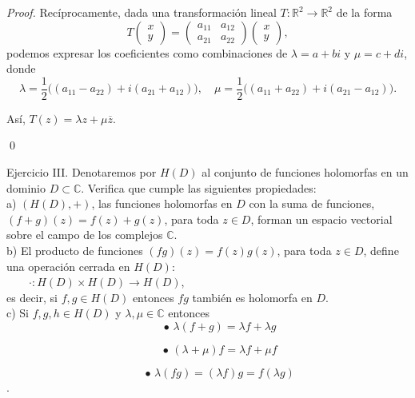 \documentclass{article}
\theoremstyle{nonumberplain}
\begin{document}
\begin{proof}
Recíprocamente, dada una transformación lineal \(T : \mathbb{R}^2 \to \mathbb{R}^2\) de la forma  
\[
T\begin{pmatrix} x \\ y \end{pmatrix} = 
\begin{pmatrix} a_{11} & a_{12} \\ a_{21} & a_{22} \end{pmatrix}
\begin{pmatrix} x \\ y \end{pmatrix},
\]  
podemos expresar los coeficientes como combinaciones de \(\lambda = a + bi\) y \(\mu = c + di\), donde  
\[
\lambda = \frac{1}{2}\big((a_{11} - a_{22}) + i(a_{21} + a_{12})\big), \quad 
\mu = \frac{1}{2}\big((a_{11} + a_{22}) + i(a_{21} - a_{12})\big).
\]

Así, \(T(z) = \lambda z + \mu \overline{z}\).  

\qed\end{proof}

Ejercicio III. Denotaremos por $H(D)$ al conjunto de funciones holomorfas en un dominio $D \subset \mathbb{C}$. Verifica que cumple las siguientes propiedades: \\

a) $(H(D), +)$, las funciones holomorfas en $D$ con la suma de funciones, $(f+g)(z)=f(z)+g(z)$, para toda $z \in D$, forman un espacio vectorial sobre el campo de los complejos $\mathbb{C}$. \\

b) El producto de funciones $(fg)(z) = f(z) g(z)$, para toda $z \in D$, define una operación cerrada en $H(D)$: \\

$\qquad \cdot : H(D) \times H(D) \to H(D)$, \\

es decir, si $f, g \in H(D)$ entonces $fg$ también es holomorfa en $D$. \\

c) Si $f,g,h \in H(D)$ y $\lambda, \mu \in \mathbb{C}$ entonces \\

$$\qquad \bullet \, \lambda(f+g) = \lambda f + \lambda g$$

$$\qquad \bullet \, (\lambda + \mu)f = \lambda f + \mu f$$ 

$$\qquad \bullet \, \lambda(fg) = (\lambda f)g = f(\lambda g)$$.
\end{document}
